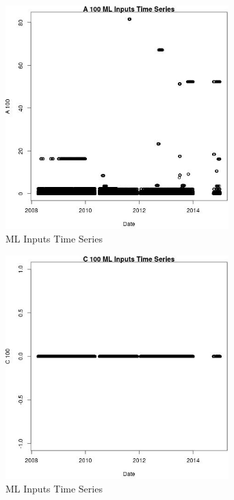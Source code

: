 \begin{figure} 
\centering  
\includegraphics[width=0.77\textwidth]{Code_Outputs/Report_ML_input_PM25_Step4_part_e_de_duplicated_aves_A_100vDate.jpg} 
\caption{\label{fig:Report_ML_input_PM25_Step4_part_e_de_duplicated_avesA_100vDate}ML Inputs Time Series} 
\end{figure} 
 

\begin{figure} 
\centering  
\includegraphics[width=0.77\textwidth]{Code_Outputs/Report_ML_input_PM25_Step4_part_e_de_duplicated_aves_C_100vDate.jpg} 
\caption{\label{fig:Report_ML_input_PM25_Step4_part_e_de_duplicated_avesC_100vDate}ML Inputs Time Series} 
\end{figure} 
 

